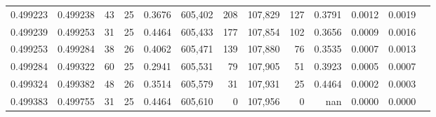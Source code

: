 \begin{tabular}{rrrrrrrrrrrrr}
0.499223 & 0.499238 &  43 &  25 &                                     0.3676 & 605,402 &     208 & 107,829 &     127 & 0.3791 & 0.0012 & 0.0019 \\
0.499239 & 0.499253 &  31 &  25 &                                     0.4464 & 605,433 &     177 & 107,854 &     102 & 0.3656 & 0.0009 & 0.0016 \\
0.499253 & 0.499284 &  38 &  26 &                                     0.4062 & 605,471 &     139 & 107,880 &      76 & 0.3535 & 0.0007 & 0.0013 \\
0.499284 & 0.499322 &  60 &  25 &                                     0.2941 & 605,531 &      79 & 107,905 &      51 & 0.3923 & 0.0005 & 0.0007 \\
0.499324 & 0.499382 &  48 &  26 &                                     0.3514 & 605,579 &      31 & 107,931 &      25 & 0.4464 & 0.0002 & 0.0003 \\
0.499383 & 0.499755 &  31 &  25 &                                     0.4464 & 605,610 &       0 & 107,956 &       0 &    nan & 0.0000 & 0.0000 \\
\bottomrule
\end{tabular}
